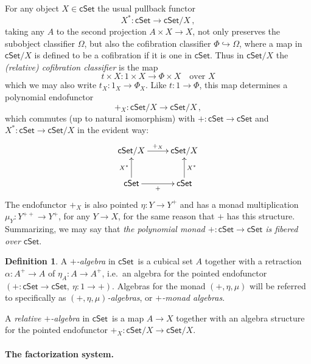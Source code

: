\documentclass[11pt]{article}
\newcommand{\cSet}{\ensuremath{\mathsf{cSet}}}
\newcommand{\hook}{\ensuremath{\hookrightarrow}}
\theoremstyle{remark}
\theoremstyle{definition}
\newtheorem{definition}[theorem]{Definition}
\begin{document}
For any object $X\in\cSet$ the usual pullback functor $$X^* : \cSet \to \cSet/X\,,$$ taking any $A$ to the second projection $A\times X\to X$, not only preserves the subobject classifier $\Omega$, but also the cofibration classifier $\Phi \hook \Omega$, where a map in $\cSet/X$ is defined to be a cofibration if it is one in \cSet. Thus in $\cSet/X$ the \emph{(relative) cofibration classifier} is the map
\[
t \times X : 1\times X \to \Phi\times X	\quad\text{over $X$}
\]
which we may also write $t_X : 1_X \to \Phi_X$.  Like $t : 1\to \Phi$, this map determines a polynomial endofunctor  $$+_X : \cSet/X \to \cSet/X\,,$$ which commutes (up to natural isomorphism) with $+ : \cSet \to \cSet$ and $X^* : \cSet \to \cSet/X$ in the evident way:
\[
\xymatrix{
\cSet/X \ar[r]^{+_X}& \cSet/X \\
\cSet \ar[u]^{X^*} \ar[r]_+ & \ar[u]_{X^*}\cSet 
}
\]
The endofunctor $+_X$ is also pointed $\eta : Y \to Y^+$ and has a monad multiplication $\mu_Y : Y^{++} \to Y^+$, for any $Y\to X$, for the same reason that $+$ has this structure.  Summarizing, we may say that \emph{the polynomial monad $+ : \cSet \to \cSet$ is fibered over \cSet}.

\begin{definition}
A \emph{$+$-algebra} in \cSet\ is a cubical set $A$ together with a retraction $\alpha : A^+\to A$ of $\eta_A : A \to A^+$, i.e.\ an algebra for the pointed endofunctor $(+ : \cSet\to \cSet,\ \eta : 1 \to +)$.  Algebras for the monad $(+, \eta, \mu)$ will be referred to specifically as \emph{$(+, \eta, \mu)$-algebras}, or \emph{$+$-monad algebras}. 

A \emph{relative $+$-algebra} in \cSet\ is a map $A \to X$ together with an algebra structure for the pointed endofunctor $+_X : \cSet/X \to \cSet/X$.
\end{definition}

\paragraph{The factorization system.}
\end{document}
